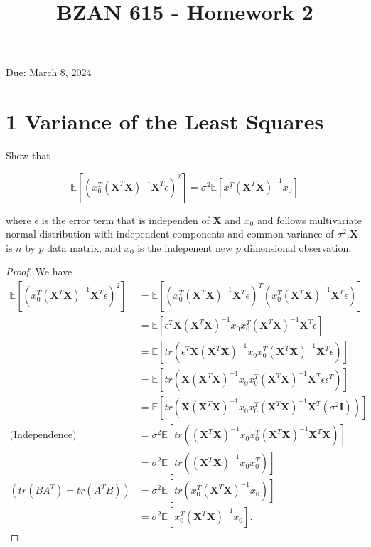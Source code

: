 \documentclass[10pt]{article}
\title{BZAN 615 - Homework 2 }
\author{}
\date{}
\begin{document}
\maketitle
Due: March 8, 2024

\section*{1 Variance of the Least Squares}
Show that

$$
\mathbb{E}\left[\left(x_{0}^{T}\left(\mathbf{X}^{T} \mathbf{X}\right)^{-1} \mathbf{X}^{T} \epsilon\right)^{2}\right]=\sigma^{2} \mathbb{E}\left[x_{0}^{T}\left(\mathbf{X}^{T} \mathbf{X}\right)^{-1} x_{0}\right]
$$

where $\epsilon$ is the error term that is independen of $\mathbf{X}$ and $x_{0}$ and follows multivariate normal distribution with independent components and common variance of $\sigma^{2} . \mathbf{X}$ is $n$ by $p$ data matrix, and $x_{0}$ is the indepenent new $p$ dimensional observation.
\begin{proof}
    We have
    \begin{align*}
        \mathbb{E}\left[\left(x_{0}^{T}\left(\mathbf{X}^{T} \mathbf{X}\right)^{-1} \mathbf{X}^{T} \epsilon\right)^{2}\right] &= \mathbb{E}\left[\left(x_{0}^{T}\left(\mathbf{X}^{T} \mathbf{X}\right)^{-1} \mathbf{X}^{T} \epsilon\right)^{T}\left(x_{0}^{T}\left(\mathbf{X}^{T} \mathbf{X}\right)^{-1} \mathbf{X}^{T} \epsilon\right)\right]\\
        &= \mathbb{E}\left[\epsilon^{T}\mathbf{X}\left(\mathbf{X}^{T} \mathbf{X}\right)^{-1} x_{0}x_{0}^{T}\left(\mathbf{X}^{T} \mathbf{X}\right)^{-1} \mathbf{X}^{T} \epsilon\right]\\
        &= \mathbb{E}\left[tr\left(\epsilon^{T}\mathbf{X}\left(\mathbf{X}^{T} \mathbf{X}\right)^{-1} x_{0}x_{0}^{T}\left(\mathbf{X}^{T} \mathbf{X}\right)^{-1} \mathbf{X}^{T} \epsilon\right)\right]\\
        & = \mathbb{E}\left[tr\left(\mathbf{X}\left(\mathbf{X}^{T} \mathbf{X}\right)^{-1} x_{0}x_{0}^{T}\left(\mathbf{X}^{T} \mathbf{X}\right)^{-1} \mathbf{X}^{T} \epsilon\epsilon^{T}\right)\right]\\
       &= \mathbb{E}\left[tr\left(\mathbf{X}\left(\mathbf{X}^{T} \mathbf{X}\right)^{-1} x_{0}x_{0}^{T}\left(\mathbf{X}^{T} \mathbf{X}\right)^{-1} \mathbf{X}^{T} (\sigma^{2}\mathbf{I})\right)\right]\\
       \text{(Independence)} &= \sigma^2 \mathbb{E}\left[tr\left(\left(\mathbf{X}^{T} \mathbf{X}\right)^{-1} x_{0}x_{0}^{T}\left(\mathbf{X}^{T} \mathbf{X}\right)^{-1} \mathbf{X}^{T} \mathbf{X}\right)\right]\\
        &= \sigma^{2} \mathbb{E}\left[tr\left(\left(\mathbf{X}^{T} \mathbf{X}\right)^{-1} x_{0}x_{0}^{T}\right)\right]\\
    (tr(BA^T)=tr(A^TB))    &= \sigma^{2} \mathbb{E}\left[tr\left(x_{0}^{T}\left(\mathbf{X}^{T} \mathbf{X}\right)^{-1} x_{0}\right)\right]\\
        &= \sigma^{2} \mathbb{E}\left[x_{0}^{T}\left(\mathbf{X}^{T} \mathbf{X}\right)^{-1} x_{0}\right].
    \end{align*}
\end{proof}
\end{document}
